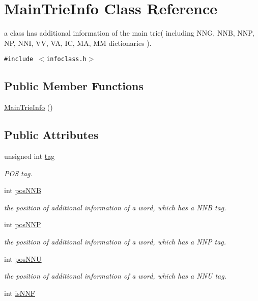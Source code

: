\hypertarget{classMainTrieInfo}{
\section{MainTrieInfo Class Reference}
\label{classMainTrieInfo}
}
a class has additional information of the main trie( including NNG, NNB, NNP, NP, NNI, VV, VA, IC, MA, MM dictionaries ).  


{\tt \#include $<$infoclass.h$>$}

\subsection*{Public Member Functions}
\begin{CompactItemize}
\item 
\hyperlink{classMainTrieInfo_c7e53d00899ba7f3b79a8adbae556154}{MainTrieInfo} ()
\end{CompactItemize}
\subsection*{Public Attributes}
\begin{CompactItemize}
\item 
unsigned int \hyperlink{classMainTrieInfo_58583e1b830e9431567f4dbda01f1f5e}{tag}
\begin{CompactList}\small\item\em POS tag. \item\end{CompactList}\item 
int \hyperlink{classMainTrieInfo_0d7bda79214949fad26706e5e3dbad84}{posNNB}
\begin{CompactList}\small\item\em the position of additional information of a word, which has a NNB tag. \item\end{CompactList}\item 
int \hyperlink{classMainTrieInfo_38e0c8dbd7a077775365baa8e82655bb}{posNNP}
\begin{CompactList}\small\item\em the position of additional information of a word, which has a NNP tag. \item\end{CompactList}\item 
int \hyperlink{classMainTrieInfo_ef418954521cb760e6f6550390a44a67}{posNNU}
\begin{CompactList}\small\item\em the position of additional information of a word, which has a NNU tag. \item\end{CompactList}\item 
int \hyperlink{classMainTrieInfo_80cbea1df4fb2319d55089b1ea4b29f4}{isNNF}
\end{CompactItemize}


